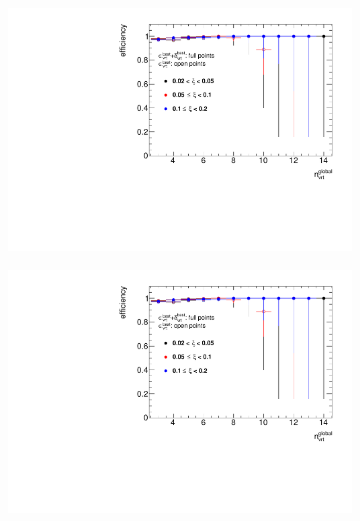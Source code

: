 \begin{figure}[h!]
	\centering
	\begin{subfigure}{.47\textwidth}
		\includegraphics[width=\textwidth,page=3]{chapters/chrgSTAR/img/vertex/vertexEffi_ksi_noFake.pdf}
	\end{subfigure}
	\begin{subfigure}{.47\textwidth}
		\includegraphics[width=\textwidth,page=4]{chapters/chrgSTAR/img/vertex/vertexEffi_ksi_noFake.pdf}
	\end{subfigure}
	\begin{subfigure}{.47\textwidth}

\end{subfigure}
\end{figure}
